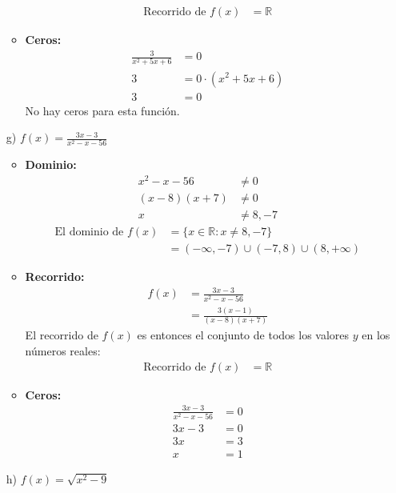 \documentclass{templateNote}
\begin{document}
\begin{itemize}
\begin{itemize}
        \begin{align*}
            \text{Recorrido de } f(x) &= \mathbb{R}
        \end{align*}
        \item \textbf{Ceros:}
        \begin{align*}
            \frac{3}{x^2 + 5x + 6} &= 0 \\
            3 &= 0 \cdot (x^2 + 5x + 6) \\
            3 &= 0
        \end{align*}
        No hay ceros para esta función.
    \end{itemize}
    \item[g)] $f(x) = \frac{3x - 3}{x^2 - x - 56}$
    \begin{itemize}
        \item \textbf{Dominio:}
        \begin{align*}
            x^2 - x - 56 &\neq 0 \\
            (x - 8)(x + 7) &\neq 0 \\
            x &\neq 8, -7
        \end{align*}
        \begin{align*}
            \text{El dominio de } f(x) &= \{x \in \mathbb{R} : x \neq 8, -7\} \\
            &= (-\infty, -7) \cup (-7, 8) \cup (8, +\infty)
        \end{align*}
        \item \textbf{Recorrido:}
        \begin{align*}
            f(x) &= \frac{3x - 3}{x^2 - x - 56} \\
            &= \frac{3(x - 1)}{(x - 8)(x + 7)}
        \end{align*}
        El recorrido de \( f(x) \) es entonces el conjunto de todos los valores \( y \) en los números reales:
        \begin{align*}
            \text{Recorrido de } f(x) &= \mathbb{R}
        \end{align*}
        \item \textbf{Ceros:}
        \begin{align*}
            \frac{3x - 3}{x^2 - x - 56} &= 0 \\
            3x - 3 &= 0 \\
            3x &= 3 \\
            x &= 1
        \end{align*}
    \end{itemize}
    \item[h)] $f(x) = \sqrt{x^2 - 9}$

\end{itemize}
\end{document}
